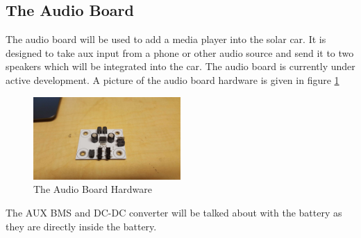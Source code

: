 \documentclass[titlepage]{article}
\begin{document}
    \subsection{The Audio Board}
    The audio board will be used to add a media player into the solar
    car. It is designed to take aux input from a phone or other audio
    source and send it to two speakers which will be integrated into the
    car. The audio board is currently under active development. A
    picture of the audio board hardware is given in figure
    \ref{fig:audio}
    \begin{figure}[H]
        \centering
        \includegraphics[width=0.5\textwidth]{images/audio_board.jpg}
        \caption{The Audio Board Hardware}
        \label{fig:audio}
    \end{figure}
    The AUX BMS and DC-DC converter will be talked about with the
    battery as they are directly inside the battery.

\end{document}
